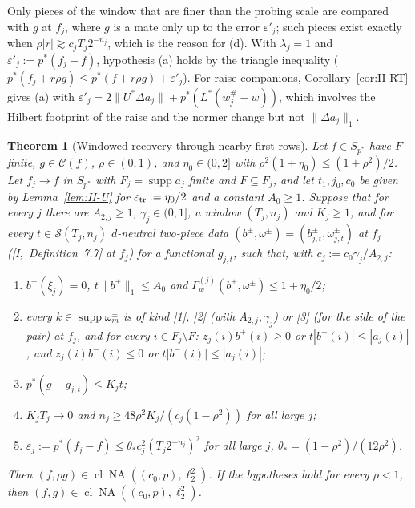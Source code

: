\documentclass[10pt]{amsart}
\newtheorem{theorem}{Theorem}[section]
\theoremstyle{definition}
\theoremstyle{remark}
\newcommand{\NA}{\operatorname{NA}}
\newcommand{\supp}{\operatorname{supp}}
\newcommand{\Cset}{\mathcal C}
\newcommand{\cl}{\operatorname{cl}}
\begin{document}
Only pieces of the window that are finer than the probing scale are
compared with $g$ at $f_j$, where $g$ is a mate only up to the error
$\varepsilon'_j$; such pieces exist exactly when $\rho|r|\gtrsim c_jT_j2^{-n_j}$,
which is the reason for (d).  With $\lambda_j=1$ and
$\varepsilon'_j:=p^*(f_j-f)$, hypothesis (a) holds by the triangle inequality
($p^*(f_j+r\rho g)\le p^*(f+r\rho g)+\varepsilon'_j$).  For raise companions,
Corollary~\ref{cor:II-RT} gives (a) with $\varepsilon'_j=2\|U^*\Delta a_j\|+
p^*(L^*(w^\#_j-w))$, which involves the Hilbert footprint of the raise and
the normer change but not $\|\Delta a_j\|_1$.

\begin{theorem}[Windowed recovery through nearby first rows]\label{thm:II-E}
Let $f\in S_{p^*}$ have $F$ finite, $g\in\Cset(f)$, $\rho\in(0,1)$, and
$\eta_0\in(0,2]$ with $\rho^2(1+\eta_0)\le(1+\rho^2)/2$.  Let $f_j\to f$ in
$S_{p^*}$ with $F_j=\supp a_j$ finite and $F\subseteq F_j$, and let
$t_1,j_0,c_0$ be given by Lemma~\textup{\ref{lem:II-U}} for
$\varepsilon_{\rm tr}:=\eta_0/2$ and a constant $A_0\ge1$.  Suppose that for
every $j$ there are $A_{2,j}\ge1$, $\gamma_j\in(0,1]$, a window $(T_j,n_j)$
and $K_j\ge1$, and for every $t\in\mathcal S(T_j,n_j)$ $d$-neutral two-piece
data $(b^\pm,\omega^\pm)=(b^\pm_{j,t},\omega^\pm_{j,t})$ at $f_j$
\textup{(}[I,~Definition~7.7] at $f_j$\textup{)} for a functional
$g_{j,t}$, such that, with $c_j:=c_0\gamma_j/A_{2,j}$:
\begin{enumerate}
\item[(E-a)] $b^\pm(\xi_j)=0$, $t\|b^\pm\|_1\le A_0$ and
$\Gamma^{(j)}_w(b^\pm,\omega^\pm)\le1+\eta_0/2$;
\item[(E-b)] every $k\in\supp\omega^\pm_m$ is of kind \textup{[1]},
\textup{[2]} \textup{(}with $A_{2,j},\gamma_j$\textup{)} or \textup{[3]}
\textup{(}for the side of the pair\textup{)} at $f_j$, and for every $i\in
F_j\setminus F$: $z_j(i)b^+(i)\ge0$ or $t|b^+(i)|\le|a_j(i)|$, and
$z_j(i)b^-(i)\le0$ or $t|b^-(i)|\le|a_j(i)|$;
\item[(E-c)] $p^*(g-g_{j,t})\le K_jt$;
\item[(E-d)] $K_jT_j\to0$ and $n_j\ge48\rho^2K_j/(c_j(1-\rho^2))$ for all
large $j$;
\item[(E-e)] $\varepsilon_j:=p^*(f_j-f)\le\theta_*c_j^2(T_j2^{-n_j})^2$ for all
large $j$, $\theta_*=(1-\rho^2)/(12\rho^2)$.
\end{enumerate}
Then $(f,\rho g)\in\cl\NA((c_0,p),\ell_2^2)$.  If the hypotheses hold for
every $\rho<1$, then $(f,g)\in\cl\NA((c_0,p),\ell_2^2)$.
\end{theorem}
\end{document}
